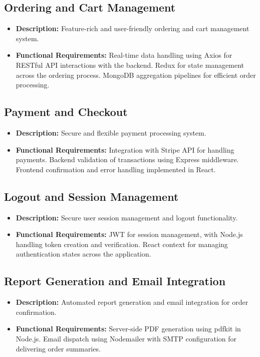 \documentclass{article}
\begin{document}
\subsection{Ordering and Cart Management}
\begin{itemize}
    \item \textbf{Description:} Feature-rich and user-friendly ordering and cart management system.
    \item \textbf{Functional Requirements:} Real-time data handling using Axios for RESTful API interactions with the backend. Redux for state management across the ordering process. MongoDB aggregation pipelines for efficient order processing.
\end{itemize}

\subsection{Payment and Checkout}
\begin{itemize}
    \item \textbf{Description:} Secure and flexible payment processing system.
    \item \textbf{Functional Requirements:} Integration with Stripe API for handling payments. Backend validation of transactions using Express middleware. Frontend confirmation and error handling implemented in React.
\end{itemize}

\subsection{Logout and Session Management}
\begin{itemize}
    \item \textbf{Description:} Secure user session management and logout functionality.
    \item \textbf{Functional Requirements:} JWT for session management, with Node.js handling token creation and verification. React context for managing authentication states across the application.
\end{itemize}

\subsection{Report Generation and Email Integration}
\begin{itemize}
    \item \textbf{Description:} Automated report generation and email integration for order confirmation.
    \item \textbf{Functional Requirements:} Server-side PDF generation using pdfkit in Node.js. Email dispatch using Nodemailer with SMTP configuration for delivering order summaries.
\end{itemize}
\end{document}
